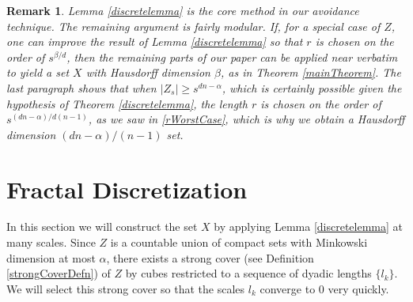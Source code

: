 \documentclass[dvipsnames,letterpaper,12pt]{article}
\numberwithin{equation}{section}
\theoremstyle{plain}
\newtheorem*{remark}{Remark}
\begin{document}
\begin{remark}
	Lemma \ref{discretelemma} is the core method in our avoidance technique. The remaining argument is fairly modular. If, for a special case of $Z$, one can improve the result of Lemma \ref{discretelemma} so that $r$ is chosen on the order of $s^{\beta/d}$, then the remaining parts of our paper can be applied near verbatim to yield a set $X$ with Hausdorff dimension $\beta$, as in Theorem \ref{mainTheorem}. The last paragraph shows that when $|Z_s| \geq s^{dn - \alpha}$, which is certainly possible given the hypothesis of Theorem \ref{discretelemma}, the length $r$ is chosen on the order of $s^{(dn-\alpha)/d(n-1)}$, as we saw in \eqref{rWorstCase}, which is why we obtain a Hausdorff dimension $(dn - \alpha)/(n-1)$ set.
\end{remark}










\section{Fractal Discretization}\label{discretizationsection}
In this section we will construct the set $X$ by applying Lemma \ref{discretelemma} at many scales. Since $Z$ is a countable union of compact sets with Minkowski dimension at most $\alpha$, there exists a strong cover (see Definition \ref{strongCoverDefn}) of $Z$ by cubes restricted to a sequence of dyadic lengths $\{ l_k \}$. We will select this strong cover so that the scales $l_k$ converge to 0 very quickly.
\end{document}
